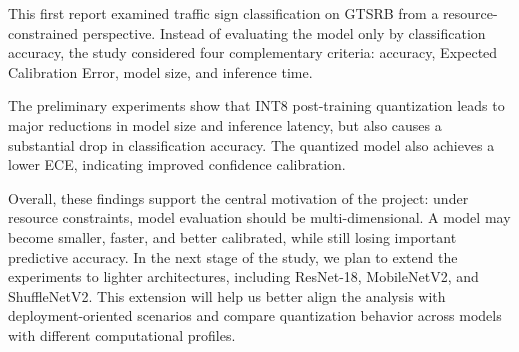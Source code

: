 \documentclass{article} %
\begin{document}
This first report examined traffic sign classification on GTSRB from a resource-constrained perspective. Instead of evaluating the model only by classification accuracy, the study considered four complementary criteria: accuracy, Expected Calibration Error, model size, and inference time.

The preliminary experiments show that INT8 post-training quantization leads to major reductions in model size and inference latency, but also causes a substantial drop in classification accuracy. The quantized model also achieves a lower ECE, indicating improved confidence calibration.

Overall, these findings support the central motivation of the project: under resource constraints, model evaluation should be multi-dimensional. A model may become smaller, faster, and better calibrated, while still losing important predictive accuracy. In the next stage of the study, we plan to extend the experiments to lighter architectures, including ResNet-18, MobileNetV2, and ShuffleNetV2. This extension will help us better align the analysis with deployment-oriented scenarios and compare quantization behavior across models with different computational profiles.

\renewcommand{\refname}{}
\end{document}
